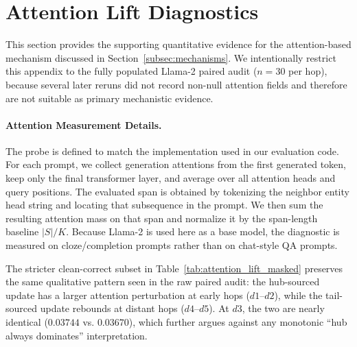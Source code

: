 \section{Attention Lift Diagnostics}
\label{app:attention_diagnostics}

This section provides the supporting quantitative evidence for the attention-based mechanism discussed in Section~\ref{subsec:mechanisms}. We intentionally restrict this appendix to the fully populated Llama-2 paired audit ($n=30$ per hop), because several later reruns did not record non-null attention fields and therefore are not suitable as primary mechanistic evidence.

\paragraph{Attention Measurement Details.}
The probe is defined to match the implementation used in our evaluation code. For each prompt, we collect generation attentions from the first generated token, keep only the final transformer layer, and average over all attention heads and query positions. The evaluated span is obtained by tokenizing the neighbor entity head string and locating that subsequence in the prompt. We then sum the resulting attention mass on that span and normalize it by the span-length baseline $|S|/K$. Because Llama-2 is used here as a base model, the diagnostic is measured on cloze/completion prompts rather than on chat-style QA prompts.



The stricter clean-correct subset in Table~\ref{tab:attention_lift_masked} preserves the same qualitative pattern seen in the raw paired audit: the hub-sourced update has a larger attention perturbation at early hops ($d1$--$d2$), while the tail-sourced update rebounds at distant hops ($d4$--$d5$). At $d3$, the two are nearly identical ($0.03744$ vs. $0.03670$), which further argues against any monotonic ``hub always dominates'' interpretation.




